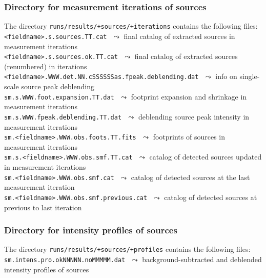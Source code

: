 \documentclass[a4paper,10pt]{article}
\begin{document}
\subsubsection{Directory for measurement iterations of sources}
\label{srciters}

The directory \verb!runs/results/+sources/+iterations! contains the following files:\\

\vspace{-2mm}\noindent
{\small\verb!<fieldname>.s.sources.TT.cat!} $\,\,\leadsto$ final catalog of extracted sources in measurement iterations\\
{\small\verb!<fieldname>.s.sources.ok.TT.cat!} $\,\,\leadsto$ final catalog of extracted sources (renumbered) in iterations\\
{\small\verb!<fieldname>.WWW.det.NN.cSSSSSSas.fpeak.deblending.dat!} $\,\,\leadsto$ info on single-scale source peak deblending\\
{\small\verb!sm.s.WWW.foot.expansion.TT.dat!} $\,\,\leadsto$ footprint expansion and shrinkage in measurement iterations\\
{\small\verb!sm.s.WWW.fpeak.deblending.TT.dat!} $\,\,\leadsto$ deblending source peak intensity in measurement iterations\\
{\small\verb!sm.<fieldname>.WWW.obs.foots.TT.fits!} $\,\,\leadsto$ footprints of sources in measurement iterations\\
{\small\verb!sm.s.<fieldname>.WWW.obs.smf.TT.cat!} $\,\,\leadsto$ catalog of detected sources updated in measurement iterations\\
{\small\verb!sm.<fieldname>.WWW.obs.smf.cat!} $\,\,\leadsto$ catalog of detected sources at the last measurement iteration\\
{\small\verb!sm.<fieldname>.WWW.obs.smf.previous.cat!} $\,\,\leadsto$ catalog of detected sources at previous to last iteration

\subsubsection{Directory for intensity profiles of sources}
\label{srccats}

The directory \verb!runs/results/+sources/+profiles! contains the following files:\\

\vspace{-2mm}\noindent
{\small\verb!sm.intens.pro.okNNNNN.noMMMMM.dat!} $\,\,\leadsto$ background-subtracted and deblended intensity profiles of sources
\end{document}
